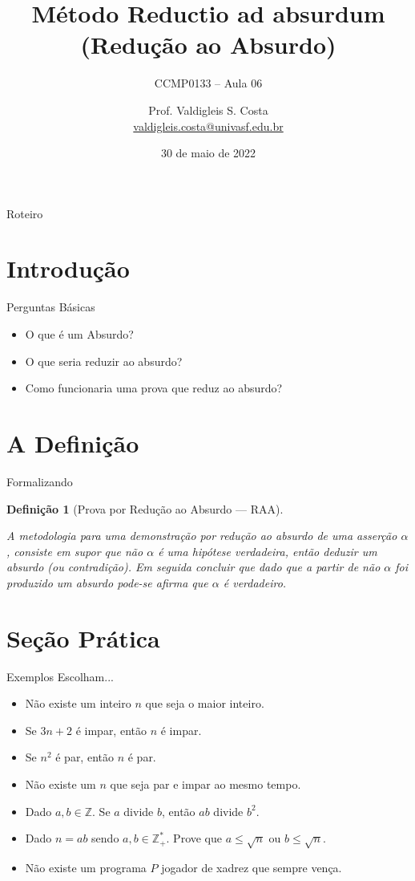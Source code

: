 \documentclass[aspectratio=169]{beamer}
\title{Método Reductio ad absurdum (Redução ao Absurdo)}
\subtitle{CCMP0133 -- Aula 06}
\date{30 de maio de 2022}
\author{Prof. Valdigleis S. Costa\\\url{valdigleis.costa@univasf.edu.br}}
\institute{Universidade Federal do Vale do São Francisco\\Colegiado de Ciência da Computação\\\textit{Campus} Salgueiro-PE}
\newtheorem{defi}{Definição}
\begin{document}
	\maketitle
	
	\begin{frame}{Roteiro}
		\tableofcontents
	\end{frame}

	\section{Introdução}
	
	\begin{frame}{Perguntas Básicas}
		\begin{itemize}
			\item  O que é um Absurdo?\pause
			\item  O que seria reduzir ao absurdo?\pause
			\item  Como funcionaria uma prova que reduz ao absurdo? 
		\end{itemize}
	\end{frame}

	\section{A Definição}
	
	\begin{frame}{Formalizando}
		\begin{defi}[Prova por Redução ao Absurdo --- RAA]
			\
			
			A metodologia para uma demonstração por redução ao absurdo de uma asserção $\alpha$, consiste em supor que não $\alpha$ é uma hipótese verdadeira, então deduzir um absurdo (ou contradição). Em seguida concluir que dado que a partir de não $\alpha$ foi produzido um absurdo pode-se afirma que $\alpha$ é verdadeiro.
		\end{defi}
	\end{frame}

	\section{Seção Prática}

	\begin{frame}{Exemplos}
		Escolham...
		\begin{itemize}
			\item Não existe um inteiro $n$ que seja o maior inteiro.
			\item Se $3n + 2$ é impar, então $n$ é impar.
			\item Se $n^2$ é par, então $n$ é par.
			\item Não existe um $n$ que seja par e impar ao mesmo tempo.
			\item Dado $a,b \in \mathbb{Z}$. Se $a$ divide $b$, então $ab$ divide $b^2$.
			\item Dado $n = ab$ sendo $a, b \in \mathbb{Z}_+^*$. Prove que $a \leq \sqrt{n}$ ou $b \leq \sqrt{n}$.
			\item Não existe um programa $P$ jogador de xadrez que sempre vença.
		\end{itemize}
	\end{frame}
\end{document}

